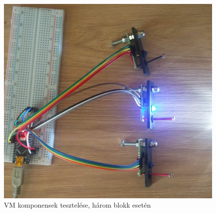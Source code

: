 \documentclass[a4paper,12pt]{article}
\begin{document}
\begin{figure}[htp]
\begin{minipage}{0.32\textwidth}
    \end{minipage}\hfill
    \begin{minipage}{0.32\textwidth}
        \centering
        \includegraphics[width=\linewidth]{images/vm_test_3.png}
    \end{minipage}
    \caption[VM teszt]{VM komponensek tesztelése, három blokk esetén}
    \label{fig:vmtest}
\end{figure}
\end{document}
